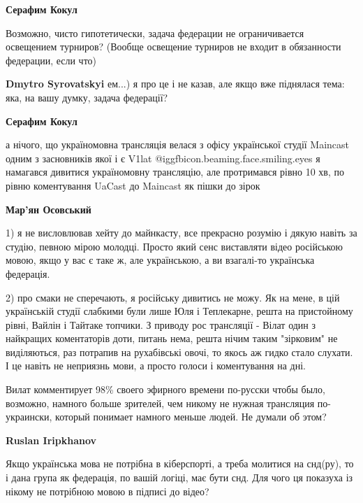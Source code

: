 \begin{itemize}
\begin{itemize}
\begin{itemize}
\textbf{Серафим Кокул} 

Возможно, чисто гипотетически, задача федерации не ограничивается освещением
турниров? (Вообще освещение турниров не входит в обязанности федерации, если
что)

\textbf{Dmytro Syrovatskyi} ем...) я про це і не казав, але якщо вже піднялася тема: яка, на вашу думку, задача федерації?
\end{itemize} %

\textbf{Серафим Кокул} 

а нічого, що україномовна трансляція велася з офісу української студії Maincast
одним з засновників якої і є V1lat  @igg{fbicon.beaming.face.smiling.eyes} я намагався дивитися україномовну
трансляцію, але протримався рівно 10 хв, по рівню коментування UaCast до
Maincast як пішки до зірок

\begin{itemize} %
\textbf{Мар'ян Осовський} 

1) я не висловлював хейту до майнкасту, все прекрасно розумію і дякую навіть за
студію, певною мірою молодці. Просто який сенс виставляти відео російською
мовою, якщо у вас є таке ж, але українською, а ви взагалі-то українська
федерація.

2) про смаки не сперечають, я російську дивитись не можу. Як на мене, в цій
українській студії слабкими були лише Юля і Теплекарне, решта на пристойному
рівні, Вайлін і Тайтаке топчики. З приводу рос трансляції - Вілат один з
найкращих коментаторів доти, питань нема, решта нічим таким "зірковим" не
виділяються, раз потрапив на рухабівські овочі, то якось аж гидко стало
слухати. І це навіть не неприязнь мови, а просто голоси і коментування на дні.

\end{itemize} %


Вилат комментирует 98\% своего эфирного времени по-русски чтобы было, возможно,
намного больше зрителей, чем никому не нужная трансляция по-украински, который
понимает намного меньше людей. Не думали об этом?

\begin{itemize} %
\textbf{Ruslan Iripkhanov} 

Якщо українська мова не потрібна в кіберспорті, а треба молитися на снд(ру), то
і дана група як федерація, по вашій логіці, має бути снд. Для чого ця показуха
із нікому не потрібною мовою в підписі до відео?


\end{itemize}
\end{itemize}
\end{itemize}
